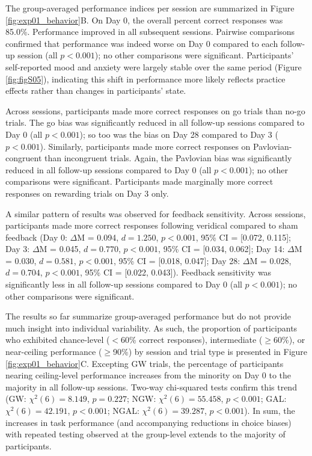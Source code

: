 \documentclass[a4paper,12pt]{article}
\begin{document}
\begin{refsection}[main]
The group-averaged performance indices per session are summarized in Figure \ref{fig:exp01_behavior}B. On Day 0, the overall percent correct responses was 85.0\%. Performance improved in all subsequent sessions. Pairwise comparisons confirmed that performance was indeed worse on Day 0 compared to each follow-up session (all $p < 0.001$); no other comparisons were significant. Participants' self-reported mood and anxiety were largely stable over the same period (Figure \ref{fig:figS05}), indicating this shift in performance more likely reflects practice effects rather than changes in participants' state. 

Across sessions, participants made more correct responses on go trials than no-go trials. The go bias was significantly reduced in all follow-up sessions compared to Day 0 (all $p < 0.001$); so too was the bias on Day 28 compared to Day 3 ($p < 0.001$). Similarly, participants made more correct responses on Pavlovian-congruent than incongruent trials. Again, the Pavlovian bias was significantly reduced in all follow-up sessions compared to Day 0 (all $p < 0.001$); no other comparisons were significant. Participants made marginally more correct responses on rewarding trials on Day 3 only.

A similar pattern of results was observed for feedback sensitivity. Across sessions, participants made more correct responses following veridical compared to sham feedback (Day 0: $\Delta$M = 0.094, $d = 1.250$, $p < 0.001$, 95\% CI = [0.072, 0.115]; Day 3: $\Delta$M = 0.045, $d = 0.770$, $p < 0.001$, 95\% CI = [0.034, 0.062]; Day 14: $\Delta$M = 0.030, $d = 0.581$, $p < 0.001$, 95\% CI = [0.018, 0.047]; Day 28: $\Delta$M = 0.028, $d = 0.704$, $p < 0.001$, 95\% CI = [0.022, 0.043]). Feedback sensitivity was significantly less in all follow-up sessions compared to Day 0 (all $p < 0.001$); no other comparisons were significant.

The results so far summarize group-averaged performance but do not provide much insight into individual variability. As such, the proportion of participants who exhibited chance-level ($<$60\% correct responses), intermediate ($\geq$60\%), or near-ceiling performance ($\geq$90\%) by session and trial type is presented in Figure \ref{fig:exp01_behavior}C. Excepting GW trials, the percentage of participants nearing ceiling-level performance increases from the minority on Day 0 to the majority in all follow-up sessions. Two-way chi-squared tests confirm this trend (GW: $\chi^2 (6) = 8.149$, $p = 0.227$; NGW: $\chi^2 (6) = 55.458$, $p < 0.001$; GAL: $\chi^2 (6) = 42.191$, $p < 0.001$; NGAL: $\chi^2 (6) = 39.287$, $p < 0.001$). In sum, the increases in task performance (and accompanying reductions in choice biases) with repeated testing observed at the group-level extends to the majority of participants. 


\end{refsection}
\end{document}
